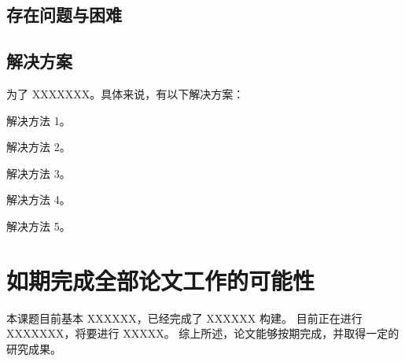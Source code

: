 \subsection{存在问题与困难}
\lipsum[4-5]

\subsection{解决方案}
为了 XXXXXXX。具体来说，有以下解决方案：
\begin{semiQuotList}
    \item 解决方法 1。
    \item 解决方法 2。
    \item 解决方法 3。
    \item 解决方法 4。
    \item 解决方法 5。
\end{semiQuotList}

\section{如期完成全部论文工作的可能性}

本课题目前基本 XXXXXX，已经完成了  XXXXXX 构建。
目前正在进行 XXXXXXX，将要进行 XXXXX。
综上所述，论文能够按期完成，并取得一定的研究成果。